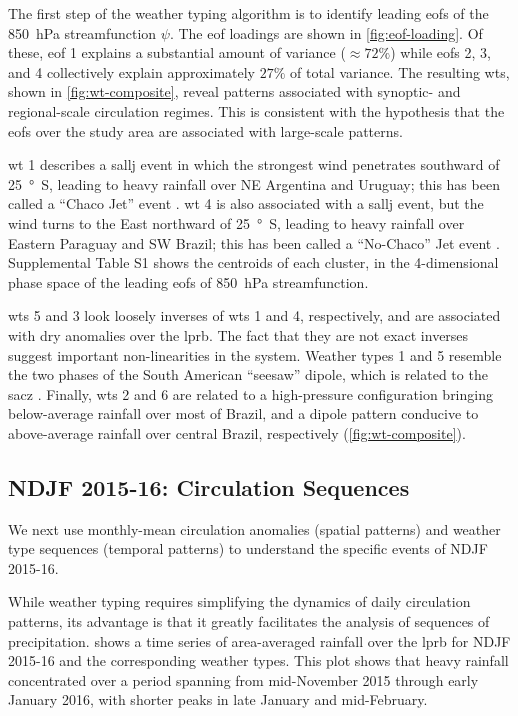 \documentclass[twocol]{ametsoc}
\begin{document}
The first step of the weather typing algorithm is to identify leading \glspl{eof} of the \SI{850}{\hecto\pascal} streamfunction $\psi$.
The \gls{eof} loadings are shown in \cref{fig:eof-loading}.
Of these, \gls{eof} 1 explains a substantial amount of variance ($\approx 72\%$) while \glspl{eof} 2, 3, and 4 collectively explain approximately $27\%$ of total variance.
The resulting \glspl{wt}, shown in \cref{fig:wt-composite}, reveal patterns associated with synoptic- and regional-scale circulation regimes.
This is consistent with the hypothesis that the \glspl{eof} over the study area are associated with large-scale patterns.

\Gls{wt} 1 describes a \gls{sallj} event in which the strongest wind penetrates southward of \SI{25}{\degree S}, leading to heavy rainfall over NE Argentina and Uruguay; this has been called a ``Chaco Jet'' event \citep{Salio2002}.
\Gls{wt} 4 is also associated with a \gls{sallj} event, but the wind turns to the East northward of \SI{25}{\degree S}, leading to heavy rainfall over Eastern Paraguay and SW Brazil; this has been called a ``No-Chaco'' Jet event \citep{Vera2006}.
Supplemental Table S1 shows the centroids of each cluster, in the 4-dimensional phase space of the leading \glspl{eof} of \SI{850}{\hecto\pascal} streamfunction.

\Glspl{wt} 5 and 3 look loosely inverses of \glspl{wt} 1 and 4, respectively, and are associated with dry anomalies over the \gls{lprb}.
The fact that they are not exact inverses suggest important non-linearities in the system.
Weather types 1 and 5 resemble the two phases of the South American ``seesaw'' dipole, which is related to the \gls{sacz} \citep{Nogues-Paegle1997}.
Finally, \glspl{wt} 2 and 6 are related to a high-pressure configuration bringing below-average rainfall over most of Brazil, and a dipole pattern conducive to above-average rainfall over central Brazil, respectively (\cref{fig:wt-composite}).

\subsection{NDJF 2015-16: Circulation Sequences}

We next use monthly-mean circulation anomalies (spatial patterns) and weather type sequences (temporal patterns) to understand the specific events of NDJF 2015-16.

While weather typing requires simplifying the dynamics of daily circulation patterns, its advantage is that it greatly facilitates the analysis of sequences of precipitation.
 shows a time series of area-averaged rainfall over the \gls{lprb} for NDJF 2015-16 and the corresponding weather types.
This plot shows that heavy rainfall concentrated over a period spanning from mid-November 2015 through early January 2016, with shorter peaks in late January and mid-February.
\end{document}
